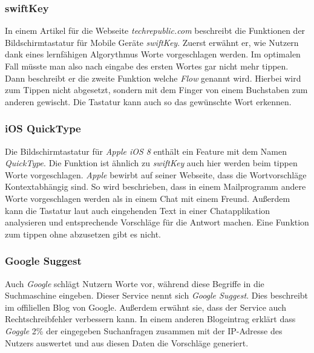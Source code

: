         \subsubsection*{swiftKey}
        	In einem Artikel für die Webseite \emph{techrepublic.com} beschreibt \cite{techrepublic:swiftKey} die Funktionen der Bildschirmtastatur für Mobile Geräte \emph{swiftKey}. Zuerst erwähnt er, wie Nutzern dank eines lernfähigen Algorythmus Worte vorgeschlagen werden. Im optimalen Fall müsste man also nach eingabe des ersten Wortes gar nicht mehr tippen. Dann beschreibt er die zweite Funktion welche \emph{Flow} genannt wird. Hierbei wird zum Tippen nicht abgesetzt, sondern mit dem Finger von einem Buchstaben zum anderen gewischt. Die Tastatur kann auch so das gewünschte Wort erkennen.
        
        \newpage
        \subsubsection*{iOS QuickType}
        
        	Die Bildschirmtastatur für \emph{Apple iOS 8} enthält ein Feature mit dem Namen \emph{QuickType}. Die Funktion ist ähnlich zu \emph{swiftKey} auch hier werden beim tippen Worte vorgeschlagen. \emph{Apple} bewirbt auf seiner Webseite, dass die Wortvorschläge Kontextabhängig sind. So wird beschrieben, dass in einem Mailprogramm andere Worte vorgeschlagen werden als in einem Chat mit einem Freund. Außerdem kann die Tastatur laut \cite{apple:quickType} auch eingehenden Text in einer Chatapplikation analysieren und entsprechende Vorschläge für die Antwort machen. Eine Funktion zum tippen ohne abzusetzen gibt es nicht.
        
        \subsubsection*{Google Suggest}
        
        	Auch \emph{Google} schlägt Nutzern Worte vor, während diese Begriffe in die Suchmaschine eingeben. Dieser Service nennt sich \emph{Google Suggest}. Dies beschreibt \cite{google:suggestIntro} im offiliellen Blog von Google. Außerdem erwähnt sie, dass der Service auch Rechtschreibfehler verbessern kann. In einem anderen Blogeintrag erklärt \cite{google:suggestUpdate} dass \emph{Goggle} 2\% der eingegeben Suchanfragen zusammen mit der IP-Adresse des Nutzers auswertet und aus diesen Daten die Vorschläge generiert.
    
    
    
    \newpage
